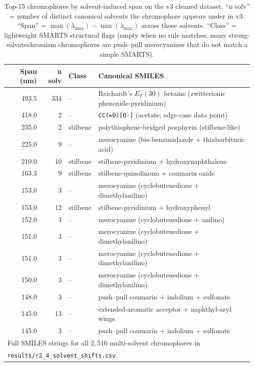 \documentclass[journal=jcisd8,manuscript=suppinfo]{achemso}
\begin{document}
\begin{table}[htbp]
\centering
\caption{Top-15 chromophores by solvent-induced span on the v3 cleaned dataset. ``n solv'' = number of distinct canonical solvents the chromophore appears under in v3. ``Span'' = $\max(\lambda_{\max}) - \min(\lambda_{\max})$ across those solvents. ``Class'' = lightweight SMARTS structural flags (empty when no rule matches; many strong-solvatochromism chromophores are push--pull merocyanines that do not match a simple SMARTS).}
\label{tab:si_solvent_shift_top}
\small
\setlength{\tabcolsep}{3pt}
\begin{tabular}{rrlp{}}
\toprule
\textbf{Span (nm)} & \textbf{n solv} & \textbf{Class} & \textbf{Canonical SMILES} \\
\midrule
493.5 & 334 & -- & Reichardt's $E_T(30)$ betaine (zwitterionic phenoxide-pyridinium) \\
418.0 & 2 & -- & \texttt{CC(=O)[O-]} (acetate, edge-case data point) \\
235.0 & 2 & stilbene & polythiophene-bridged porphyrin (stilbene-like) \\
225.0 & 9 & -- & merocyanine (bis-benzimidazole + thiabarbituric acid) \\
210.0 & 10 & stilbene & stilbene-pyridinium + hydroxynaphthalene \\
163.3 & 9 & stilbene & stilbene-quinolinium + coumarin oxide \\
153.0 & 3 & -- & merocyanine (cyclobutenedione + dimethylanilino) \\
153.0 & 12 & stilbene & stilbene-pyridinium + hydroxyphenyl \\
152.0 & 3 & -- & merocyanine (cyclobutenedione + anilino) \\
151.0 & 3 & -- & merocyanine (cyclobutenedione + dimethylanilino) \\
151.0 & 3 & -- & merocyanine (cyclobutenedione + dimethylanilino) \\
150.0 & 3 & -- & merocyanine (cyclobutenedione + dimethylanilino) \\
148.0 & 3 & -- & push--pull coumarin + indolium + sulfonate \\
145.0 & 13 & -- & extended-aromatic acceptor + naphthyl-aryl wings \\
145.0 & 3 & -- & push--pull coumarin + indolium + sulfonate \\
\bottomrule
\multicolumn{4}{l}{\footnotesize Full SMILES strings for all $2{,}516$ multi-solvent chromophores in} \\
\multicolumn{4}{l}{\footnotesize \texttt{results/r2\_4\_solvent\_shifts.csv}.} \\
\end{tabular}
\end{table}
\end{document}
